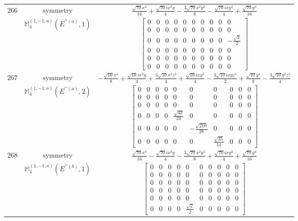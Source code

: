\documentclass[fleqn,8pt,landscape]{jsarticle}
\begin{document}
\begin{longtable}{ccc}
$ 266 $ & $ \text{symmetry} $ & $ \frac{\sqrt{70} x^{4}}{16} + \frac{\sqrt{70} i x^{3} y}{4} - \frac{3 \sqrt{70} x^{2} y^{2}}{8} - \frac{\sqrt{70} i x y^{3}}{4} + \frac{\sqrt{70} y^{4}}{16} $ \\
$  $ & $ \mathbb{M}_{4}^{(1,-1;a)}(E^{\prime\prime(a)},1) $ & $ \begin{bmatrix} 0 & 0 & 0 & 0 & 0 & 0 & 0 & 0 & 0 & 0 \\ 0 & 0 & 0 & 0 & 0 & 0 & 0 & 0 & 0 & 0 \\ 0 & 0 & 0 & 0 & 0 & 0 & 0 & 0 & 0 & - \frac{\sqrt{2}}{2} \\ 0 & 0 & 0 & 0 & 0 & 0 & 0 & 0 & 0 & 0 \\ 0 & 0 & 0 & 0 & 0 & 0 & 0 & 0 & 0 & 0 \\ 0 & 0 & 0 & 0 & 0 & 0 & 0 & 0 & 0 & 0 \end{bmatrix} $ \\ \hline
$ 267 $ & $ \text{symmetry} $ & $ - \frac{\sqrt{10} x^{4}}{8} + \frac{\sqrt{10} i x^{3} y}{4} + \frac{3 \sqrt{10} x^{2} z^{2}}{4} + \frac{\sqrt{10} i x y^{3}}{4} - \frac{3 \sqrt{10} i x y z^{2}}{2} + \frac{\sqrt{10} y^{4}}{8} - \frac{3 \sqrt{10} y^{2} z^{2}}{4} $ \\
$  $ & $ \mathbb{M}_{4}^{(1,-1;a)}(E^{\prime\prime(a)},2) $ & $ \begin{bmatrix} 0 & 0 & 0 & 0 & 0 & 0 & 0 & 0 & 0 & 0 \\ 0 & 0 & 0 & 0 & 0 & 0 & 0 & 0 & 0 & 0 \\ 0 & 0 & 0 & 0 & 0 & 0 & 0 & 0 & 0 & 0 \\ 0 & 0 & 0 & 0 & \frac{\sqrt{42}}{28} & 0 & 0 & 0 & 0 & 0 \\ 0 & 0 & 0 & 0 & 0 & - \frac{\sqrt{210}}{28} & 0 & 0 & 0 & 0 \\ 0 & 0 & 0 & 0 & 0 & 0 & \frac{\sqrt{35}}{14} & 0 & 0 & 0 \end{bmatrix} $ \\ \hline
$ 268 $ & $ \text{symmetry} $ & $ \frac{\sqrt{70} x^{4}}{16} - \frac{\sqrt{70} i x^{3} y}{4} - \frac{3 \sqrt{70} x^{2} y^{2}}{8} + \frac{\sqrt{70} i x y^{3}}{4} + \frac{\sqrt{70} y^{4}}{16} $ \\
$  $ & $ \mathbb{M}_{4}^{(1,-1;a)}(E^{\prime\prime(b)},1) $ & $ \begin{bmatrix} 0 & 0 & 0 & 0 & 0 & 0 & 0 & 0 & 0 & 0 \\ 0 & 0 & 0 & 0 & 0 & 0 & 0 & 0 & 0 & 0 \\ 0 & 0 & 0 & 0 & 0 & 0 & 0 & 0 & 0 & 0 \\ 0 & 0 & 0 & 0 & 0 & 0 & 0 & 0 & 0 & 0 \\ 0 & 0 & 0 & 0 & 0 & 0 & 0 & 0 & 0 & 0 \\ 0 & 0 & 0 & 0 & \frac{\sqrt{2}}{2} & 0 & 0 & 0 & 0 & 0 \end{bmatrix} $ \\ \hline

\end{longtable}
\end{document}
